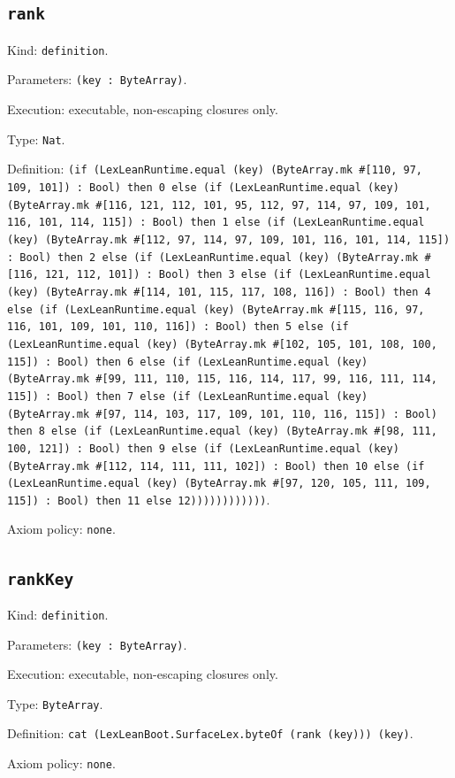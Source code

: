 \documentclass[11pt]{article}
\begin{document}
\subsection*{\texttt{rank}}
\noindent Kind: \texttt{definition}.\par
\noindent Parameters: \texttt{(key : ByteArray)}.\par
\noindent Execution: executable, non-escaping closures only.\par
\noindent Type: \texttt{Nat}.\par
\noindent Definition: \texttt{(if (LexLeanRuntime.equal (key) (ByteArray.mk \#[110, 97, 109, 101]) : Bool) then 0 else (if (LexLeanRuntime.equal (key) (ByteArray.mk \#[116, 121, 112, 101, 95, 112, 97, 114, 97, 109, 101, 116, 101, 114, 115]) : Bool) then 1 else (if (LexLeanRuntime.equal (key) (ByteArray.mk \#[112, 97, 114, 97, 109, 101, 116, 101, 114, 115]) : Bool) then 2 else (if (LexLeanRuntime.equal (key) (ByteArray.mk \#[116, 121, 112, 101]) : Bool) then 3 else (if (LexLeanRuntime.equal (key) (ByteArray.mk \#[114, 101, 115, 117, 108, 116]) : Bool) then 4 else (if (LexLeanRuntime.equal (key) (ByteArray.mk \#[115, 116, 97, 116, 101, 109, 101, 110, 116]) : Bool) then 5 else (if (LexLeanRuntime.equal (key) (ByteArray.mk \#[102, 105, 101, 108, 100, 115]) : Bool) then 6 else (if (LexLeanRuntime.equal (key) (ByteArray.mk \#[99, 111, 110, 115, 116, 114, 117, 99, 116, 111, 114, 115]) : Bool) then 7 else (if (LexLeanRuntime.equal (key) (ByteArray.mk \#[97, 114, 103, 117, 109, 101, 110, 116, 115]) : Bool) then 8 else (if (LexLeanRuntime.equal (key) (ByteArray.mk \#[98, 111, 100, 121]) : Bool) then 9 else (if (LexLeanRuntime.equal (key) (ByteArray.mk \#[112, 114, 111, 111, 102]) : Bool) then 10 else (if (LexLeanRuntime.equal (key) (ByteArray.mk \#[97, 120, 105, 111, 109, 115]) : Bool) then 11 else 12))))))))))))}.\par
\noindent Axiom policy: \texttt{none}.\par
\subsection*{\texttt{rankKey}}
\noindent Kind: \texttt{definition}.\par
\noindent Parameters: \texttt{(key : ByteArray)}.\par
\noindent Execution: executable, non-escaping closures only.\par
\noindent Type: \texttt{ByteArray}.\par
\noindent Definition: \texttt{cat (LexLeanBoot.SurfaceLex.byteOf (rank (key))) (key)}.\par
\noindent Axiom policy: \texttt{none}.\par
\end{document}
